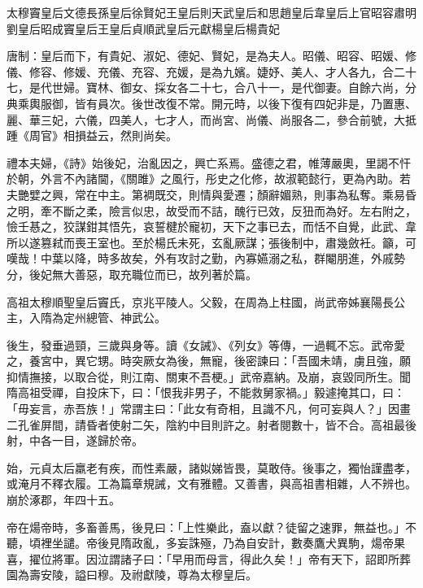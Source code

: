 
\begin{pinyinscope}

 太穆竇皇后文德長孫皇后徐賢妃王皇后則天武皇后和思趙皇后韋皇后上官昭容肅明劉皇后昭成竇皇后王皇后貞順武皇后元獻楊皇后楊貴妃



 唐制：皇后而下，有貴妃、淑妃、德妃、賢妃，是為夫人。昭儀、昭容、昭媛、修儀、修容、修媛、充儀、充容、充媛，是為九嬪。婕妤、美人、才人各九，合二十七，是代世婦。寶林、御女、採女各二十七，合八十一，是代御妻。自餘六尚，分典乘輿服御，皆有員次。後世改復不常。開元時，以後下復有四妃非是，乃置惠、麗、華三妃，六儀，四美人，七才人，而尚宮、尚儀、尚服各二，參合前號，大抵踵《周官》相損益云，然則尚矣。



 禮本夫婦，《詩》始後妃，治亂因之，興亡系焉。盛德之君，帷薄嚴奧，里謁不忓於朝，外言不內諸閫，《關雎》之風行，彤史之化修，故淑範懿行，更為內助。若夫艷嬖之興，常在中主。第裯既交，則情與愛遷；顏辭媚熟，則事為私奪。乘易昏之明，牽不斷之柔，險言似忠，故受而不詰，醜行已效，反狃而為好。左右附之，憸壬惎之，狡謀鉗其悟先，哀誓楗於寵初，天下之事已去，而恬不自覺，此武、韋所以遂篡弒而喪王室也。至於楊氏未死，玄亂厥謀；張後制中，肅幾斂衽。籲，可嘆哉！中葉以降，時多故矣，外有攻討之勤，內寡嬿溺之私，群閹朋進，外戚勢分，後妃無大善惡，取充職位而已，故列著於篇。



 高祖太穆順聖皇后竇氏，京兆平陵人。父毅，在周為上柱國，尚武帝姊襄陽長公主，入隋為定州總管、神武公。



 後生，發垂過頸，三歲與身等。讀《女誡》、《列女》等傳，一過輒不忘。武帝愛之，養宮中，異它甥。時突厥女為後，無寵，後密諫曰：「吾國未靖，虜且強，願抑情撫接，以取合從，則江南、關東不吾梗。」武帝嘉納。及崩，哀毀同所生。聞隋高祖受禪，自投床下，曰：「恨我非男子，不能救舅家禍。」毅遽掩其口，曰：「毋妄言，赤吾族！」常謂主曰：「此女有奇相，且識不凡，何可妄與人？」因畫二孔雀屏間，請昏者使射二矢，陰約中目則許之。射者閱數十，皆不合。高祖最後射，中各一目，遂歸於帝。



 始，元貞太后羸老有疾，而性素嚴，諸姒娣皆畏，莫敢侍。後事之，獨怡謹盡孝，或淹月不釋衣履。工為篇章規誡，文有雅體。又善書，與高祖書相雜，人不辨也。崩於涿郡，年四十五。



 帝在煬帝時，多畜善馬，後見曰：「上性樂此，盍以獻？徒留之速罪，無益也。」不聽，頃裡坐譴。帝後見隋政亂，多妄誅殛，乃為自安計，數奏鷹犬異駒，煬帝果喜，擢位將軍。因泣謂諸子曰：「早用而母言，得此久矣！」帝有天下，詔即所葬園為壽安陵，謚曰穆。及祔獻陵，尊為太穆皇后。




\end{pinyinscope}
